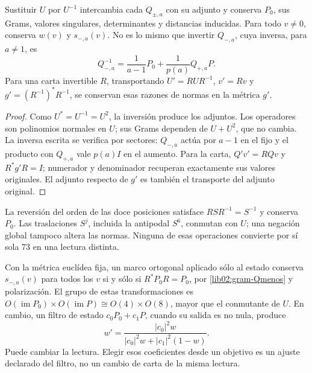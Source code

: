 \begin{proposition}
\label{lib02:inversion-carta}
Sustituir \(U\) por \(U^{-1}\) intercambia cada \(Q_{\pm,a}\)
con su adjunto y conserva \(P_0\), sus Grams, valores singulares,
determinantes y distancias inducidas. Para todo \(v\ne0\), conserva
\(w(v)\) y \(s_{-,a}(v)\). No es lo mismo que invertir
\(Q_{-,a}\), cuya inversa, para \(a\ne1\), es
\begin{equation}
 Q_{-,a}^{-1}
 =\frac1{a-1}P_0+\frac1{p(a)}Q_{+,a}P.
 \label{lib02:inversa-Q}
\end{equation}
Para una carta invertible \(R\), transportando
\(U'=RUR^{-1}\), \(v'=Rv\) y
\(g'=(R^{-1})^*R^{-1}\), se conservan esas razones de normas en
la métrica \(g'\).
\end{proposition}
\begin{proof}
Como \(U^*=U^{-1}=U^2\), la inversión produce los adjuntos.
Los operadores son polinomios normales en \(U\); sus Grams dependen
de \(U+U^2\), que no cambia. La inversa escrita se verifica por
sectores: \(Q_{-,a}\) actúa por \(a-1\) en el fijo y el producto
con \(Q_{+,a}\) vale \(p(a)I\) en el aumento. Para la carta,
\(Q'v'=RQv\) y \(R^*g'R=I\); numerador y denominador recuperan
exactamente sus valores originales. El adjunto respecto de \(g'\)
es también el transporte del adjunto original.
\end{proof}

La reversión del orden de las doce posiciones satisface
\(RSR^{-1}=S^{-1}\) y conserva \(P_0\). Las traslaciones \(S^j\),
incluida la antipodal \(S^6\), conmutan con \(U\); una negación
global tampoco altera las normas. Ninguna de esas operaciones convierte
por sí sola 73 en una lectura distinta.

Con la métrica euclídea fija, un marco ortogonal aplicado sólo al estado
conserva \(s_{-,a}(v)\) para todos los \(v\) si y sólo si
\(R^*P_0R=P_0\), por \eqref{lib02:gram-Qmenos} y polarización.
El grupo de estas transformaciones es
\(O(\operatorname{im}P_0)\times O(\operatorname{im}P)
\cong O(4)\times O(8)\), mayor que el conmutante de \(U\).
En cambio, un filtro de estado
\(c_0P_0+c_1P\), cuando su salida es no nula, produce
\begin{equation}
 w'=
 \frac{|c_0|^2w}{|c_0|^2w+|c_1|^2(1-w)}.
 \label{lib02:filtro-pesos}
\end{equation}
Puede cambiar la lectura. Elegir esos coeficientes desde un objetivo es
un ajuste declarado del filtro, no un cambio de carta de la misma
lectura.

